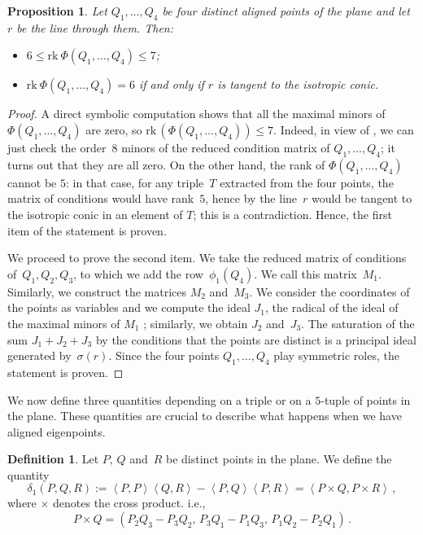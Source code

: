 \documentclass[12pt, a4paper, reqno, captions=tableheading,bibliography=totoc]{scrartcl}
\theoremstyle{plain}
\newtheorem{prop}[lemma]{Proposition}
\theoremstyle{definition}
\newtheorem{definition}[lemma]{Definition}
\newcommand{\scl}[2]{\left\langle {#1}, {#2} \right\rangle}
\begin{document}
\begin{prop}
\label{proposition:four_aligned}
Let $Q_1, \dotsc, Q_4$ be four distinct aligned points of the plane and
let $r$ be the line through them. Then:
\begin{itemize}
\item $6 \leq \text{rk} \ \Phi(Q_1, \dotsc, Q_4) \leq 7$;
\item $\text{rk} \ \Phi(Q_1, \dotsc, Q_4) = 6$ if and only if $r$ is tangent
to the isotropic conic.
\end{itemize}
\end{prop}
\begin{proof}
  A direct symbolic computation shows that all the maximal minors of~$\Phi(Q_1, \dotsc, Q_4)$ are
  zero, so $\mathrm{rk}\,(\Phi(Q_1, \dotsc, Q_4)) \leq 7$.
  Indeed, in view of , we can just check the order~$8$ minors of the reduced condition matrix of $Q_1, \dotsc, Q_4$; it turns out that they are all zero.
  On the other hand, the rank of $\Phi(Q_1, \dotsc, Q_4)$ cannot be $5$:
  in that case, for any triple~$T$ extracted from the four points, the matrix of conditions would have rank~$5$, hence by  the line~$r$ would be tangent to the isotropic conic in an element of $T$; this is a contradiction.
  Hence, the first item of the statement is proven.

  We proceed to prove the second item.
  We take the reduced matrix of conditions of~$Q_1, Q_2, Q_3$, to which we add the row~$\phi_1(Q_4)$.
  We call this matrix~$M_1$.
  Similarly, we construct the matrices $M_2$ and~$M_3$.
  We consider the coordinates of the points as variables and we compute
  the ideal $J_1$, the radical of the ideal of the maximal minors of $M_1$ ; similarly, we obtain $J_2$ and~$J_3$.
  The saturation of the sum $J_1 + J_2 + J_3$ by the conditions that the points are distinct is a principal ideal generated by~$\sigma(r)$.
  Since the four points $Q_1, \dotsc, Q_4$ play symmetric roles, the statement is proven.
\end{proof}

We now define three quantities depending on a triple or on a $5$-tuple of points in the plane.
These quantities are crucial to describe what happens when we have aligned eigenpoints.

\begin{definition}
\label{definition:delta1}
 Let $P$, $Q$ and~$R$ be distinct points in the plane.
 We define the quantity
 \[
  \delta_1(P, Q, R) :=
  \scl{P}{P} \scl{Q}{R} - \scl{P}{Q}\scl{P}{R}
  =
  \scl{P\times Q}{P \times R} \,,
 \]
 where $\times$ denotes the cross product. i.e.,
 \[
  P \times Q = (P_2 Q_3 - P_3 Q_2, \, P_3 Q_1 - P_1 Q_3, \, P_1 Q_2 - P_2 Q_1) \,.
 \]

\end{definition}
\end{document}
